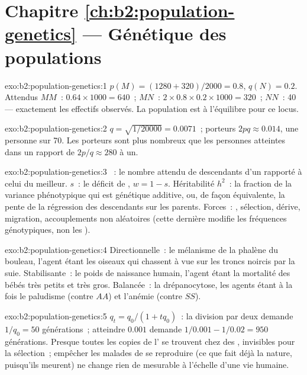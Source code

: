 \section*{Chapitre \ref{ch:b2:population-genetics} --- Génétique des populations}

\begin{solution}{exo:b2:population-genetics:1}
$p(M) = (1280 + 320)/2000 = 0.8$, $q(N) = 0.2$. Attendus $MM$~:
$0.64\times 1000 = 640$~; $MN$~: $2\times 0.8\times 0.2\times 1000 =
320$~; $NN$~: 40 --- exactement les effectifs observés. La population est
à l'équilibre pour ce locus.
\end{solution}

\begin{solution}{exo:b2:population-genetics:2}
$q = \sqrt{1/20000} = 0.0071$~; porteurs $2pq \approx 0.014$, une
personne sur 70. Les porteurs sont plus nombreux que les personnes
atteintes dans un rapport de $2p/q \approx
280$ à un.
\end{solution}

\begin{solution}{exo:b2:population-genetics:3}
~: le nombre attendu de descendants d'un 
rapporté à celui du meilleur.  $s$~: le déficit
de , $w = 1 -
s$. Héritabilité $h^{2}$~: la fraction de la variance phénotypique qui
est génétique additive, ou, de façon équivalente, la pente de la
régression des descendants sur les parents. Forces~: ,
sélection, dérive, migration, accouplements non aléatoires (cette
dernière modifie les fréquences génotypiques, non les ).
\end{solution}

\begin{solution}{exo:b2:population-genetics:4}
Directionnelle~: le mélanisme de la phalène du bouleau, l'agent étant
les oiseaux qui chassent à vue sur les troncs noircis par la suie.
Stabilisante~: le poids de naissance humain, l'agent étant la mortalité
des bébés très petits et très gros. Balancée~: la drépanocytose, les
agents étant à la fois le paludisme (contre $AA$) et l'anémie (contre
$SS$).
\end{solution}

\begin{solution}{exo:b2:population-genetics:5}
$q_t = q_0/(1 + tq_0)$~: la division par deux demande $1/q_0 = 50$
générations~; atteindre $0.001$ demande $1/0.001 - 1/0.02 = 950$
générations. Presque toutes les copies de l' se trouvent chez des
, invisibles pour la sélection~; empêcher les malades de se
reproduire (ce que fait déjà la nature, puisqu'ils meurent) ne change
rien de mesurable à l'échelle d'une vie humaine.
\end{solution}


